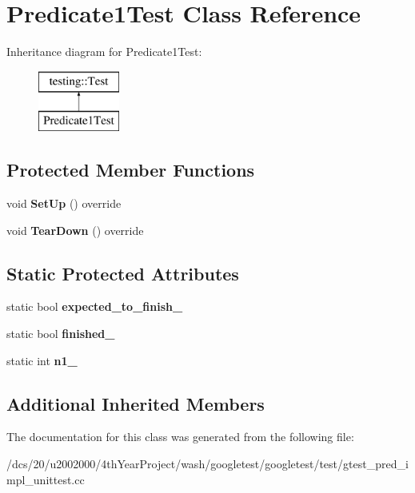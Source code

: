 \hypertarget{classPredicate1Test}{}\section{Predicate1\+Test Class Reference}
\label{classPredicate1Test}
Inheritance diagram for Predicate1\+Test\+:\begin{figure}[H]
\begin{center}
\leavevmode
\includegraphics[height=2.000000cm]{classPredicate1Test}
\end{center}
\end{figure}
\subsection*{Protected Member Functions}
\begin{DoxyCompactItemize}
\item 
\mbox{\label{classPredicate1Test_a26ffe626e992d5983e6a48c965b0a0a9}} 
void {\bfseries Set\+Up} () override
\item 
\mbox{\label{classPredicate1Test_aacedc6281afabd551ae2e67777016f3d}} 
void {\bfseries Tear\+Down} () override
\end{DoxyCompactItemize}
\subsection*{Static Protected Attributes}
\begin{DoxyCompactItemize}
\item 
\mbox{\label{classPredicate1Test_ad91cfa58e6352d53abacce32df2ef635}} 
static bool {\bfseries expected\+\_\+to\+\_\+finish\+\_\+}
\item 
\mbox{\label{classPredicate1Test_a6d45fb2d1f01a5c8baf28f60039c244e}} 
static bool {\bfseries finished\+\_\+}
\item 
\mbox{\label{classPredicate1Test_a528d9f7f618b17802962a3824eea11e3}} 
static int {\bfseries n1\+\_\+}
\end{DoxyCompactItemize}
\subsection*{Additional Inherited Members}


The documentation for this class was generated from the following file\+:\begin{DoxyCompactItemize}
\item 
/dcs/20/u2002000/4th\+Year\+Project/wash/googletest/googletest/test/gtest\+\_\+pred\+\_\+impl\+\_\+unittest.\+cc\end{DoxyCompactItemize}
